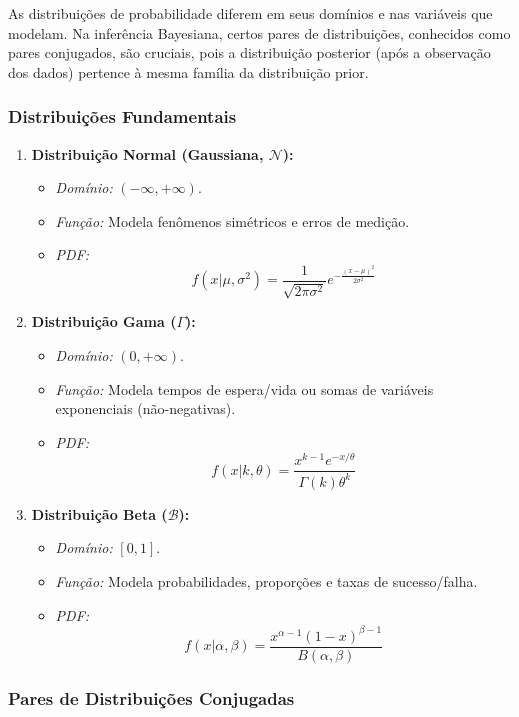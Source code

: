 \documentclass{article}
\begin{document}
As distribuições de probabilidade diferem em seus domínios e nas variáveis que modelam. Na inferência Bayesiana, certos pares de distribuições, conhecidos como pares conjugados, são cruciais, pois a distribuição posterior (após a observação dos dados) pertence à mesma família da distribuição prior.

\subsubsection{Distribuições Fundamentais}

\begin{enumerate}
	\item \textbf{Distribuição Normal (Gaussiana, $\mathcal{N}$):}
	\begin{itemize}
		\item \textit{Domínio:} $(-\infty, +\infty)$.
		\item \textit{Função:} Modela fenômenos simétricos e erros de medição.
		\item \textit{PDF:} $$f(x|\mu, \sigma^2) = \frac{1}{\sqrt{2\pi\sigma^2}} e^{-\frac{(x-\mu)^2}{2\sigma^2}}$$
	\end{itemize}
	
	\item \textbf{Distribuição Gama ($\Gamma$):}
	\begin{itemize}
		\item \textit{Domínio:} $(0, +\infty)$.
		\item \textit{Função:} Modela tempos de espera/vida ou somas de variáveis exponenciais (não-negativas).
		\item \textit{PDF:} $$f(x|k, \theta) = \frac{x^{k-1}e^{-x/\theta}}{\Gamma(k)\theta^k}$$
	\end{itemize}
	
	\item \textbf{Distribuição Beta ($\mathcal{B}$):}
	\begin{itemize}
		\item \textit{Domínio:} $[0, 1]$.
		\item \textit{Função:} Modela probabilidades, proporções e taxas de sucesso/falha.
		\item \textit{PDF:} $$f(x|\alpha, \beta) = \frac{x^{\alpha-1}(1-x)^{\beta-1}}{B(\alpha, \beta)}$$
	\end{itemize}
\end{enumerate}

\subsubsection{Pares de Distribuições Conjugadas}
\end{document}
